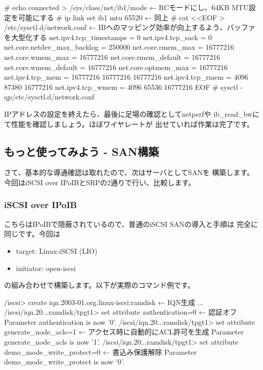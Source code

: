 \documentclass[mingoth,a4paper]{jsarticle}
\begin{document}
\begin{commandline}
# echo connected > /sys/class/net/ib1/mode ← RCモードにし、64KB MTU設定を可能にする
# ip link set ib1 mtu 65520                ← 同上
# cat <<EOF > /etc/sysctl.d/network.conf   ← IBへのマッピング効率が向上するよう、バッファを大型化する
net.ipv4.tcp_timestamps = 0
net.ipv4.tcp_sack = 0
net.core.netdev_max_backlog = 250000
net.core.rmem_max = 16777216
net.core.wmem_max = 16777216
net.core.rmem_default = 16777216
net.core.wmem_default = 16777216
net.core.optmem_max = 16777216
net.ipv4.tcp_mem = 16777216 16777216 16777216
net.ipv4.tcp_rmem = 4096 87380 16777216
net.ipv4.tcp_wmem = 4096 65536 16777216
EOF
# sysctl -qp/etc/sysctl.d/network.conf
\end{commandline}

IPアドレスの設定を終えたら、最後に足場の確認としてnetperfや
ib\_read\_bwにて性能を確認しましょう。ほぼワイヤレートが
出せていれば作業は完了です。

\subsection{もっと使ってみよう - SAN構築}
さて、基本的な導通確認は取れたので、次はサーバとしてSANを
構築します。今回はiSCSI over IPoIBとSRPの2通りで行い、比較します。

\subsubsection{iSCSI over IPoIB}
こちらはIPoIBで隠蔽されているので、普通のiSCSI SANの導入と手順は
完全に同じです。今回は
\begin{itemize}
\item target: Linux-iSCSI (LIO)
\item initiator: open-iscsi
\end{itemize}
の組み合わせで構築します。以下が実際のコマンド例です。


\begin{commandline}
/iscsi> create iqn.2003-01.org.linux-iscsi:ramdisk ← IQN生成
...
/iscsi/iqn.20...ramdisk/tpgt1> set attribute authentication=0 ← 認証オフ
Parameter authentication is now '0'.
/iscsi/iqn.20...ramdisk/tpgt1> set attribute generate_node_acls=1 ← アクセス時に自動的にACL許可を生成
Parameter generate_node_acls is now '1'.
/iscsi/iqn.20...ramdisk/tpgt1> set attribute demo_mode_write_protect=0 ← 書込み保護解除
Parameter demo_mode_write_protect is now '0'.
\end{commandline}
\end{document}
